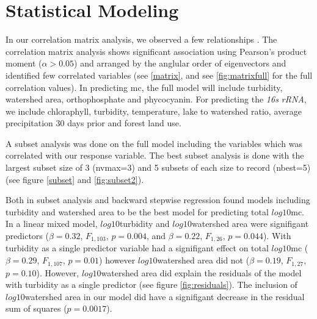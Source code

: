 \clearpage

\section{Statistical Modeling}

In our correlation matrix analysis, we observed a few relationships  . The correlation matrix analysis shows significant association using Pearson's product moment ($\alpha>0.05$) and arranged by the anglular order of eigenvectors and identified few correlated variables (see \ref{matrix}, and see \ref{fig:matrixfull} for the full correlation values). In predicting \gls{mc}, the full model will include turbidity, watershed area, orthophosphate and phycocyanin. For predicting the \emph{16s rRNA}, we include chloraphyll, turbidity, temperature, lake to watershed ratio, average precipitation 30 days prior and forest land use.


A subset analysis was done on the full model including the variables  which was correlated with our response variable. The best subset analysis is done with the largest subset size of 3 (nvmax=3) and 5 subsets of each size to record (nbest=5) (see figure \ref{subset} and \ref{fig:subset2}).

Both in subset analysis and backward stepwise regression found models including turbidity and watershed area to be  the best model for predicting total $log10$\gls{mc}. In a linear mixed model, $log10$turbidity and $log10$watershed area were signifigant predictors ($\beta=0.32$, $F_{{1,103}}$, $p=0.004$, and $\beta=0.22$, $F_{{1,26}}$, $p=0.044$). With turbidity as a single predictor variable had a signifigant effect on total $log10$\gls{mc} ($\beta=0.29$, $F_{{1,107}}$, $p=0.01$) however $log10$watershed area did not ($\beta=0.19$, $F_{{1,27}}$, $p=0.10$). However, $log10$watershed area did explain the residuals of the model with turbidity as a single predictor (see figure \ref{fig:residuals}). The inclusion of $log10$watershed area in our model did have a signifigant decrease in the residual sum of squares ($p=0.0017$). 

